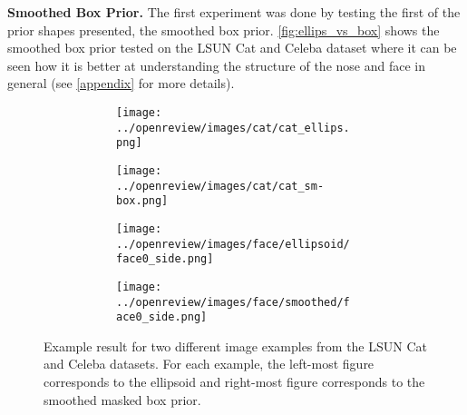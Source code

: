 \textbf{Smoothed Box Prior.}
The first experiment was done by testing the first of the prior shapes presented, the smoothed box prior. \autoref{fig:ellips_vs_box} shows the smoothed box prior tested on the LSUN Cat and Celeba dataset where it can be seen how it is better at understanding the structure of the nose and face in general (see \autoref{appendix} for more details). \begin{figure}[!htb]
    \centering
    \begin{subfigure}{0.40\textwidth}
        \begin{subfigure}{0.48\textwidth}
            \centering
            \texttt{[image: ../openreview/images/cat/cat\_ellips.png]}
        \end{subfigure}
        \begin{subfigure}{0.48\textwidth}
            \centering
            \texttt{[image: ../openreview/images/cat/cat\_sm-box.png]}
        \end{subfigure}
    \end{subfigure}
    \begin{subfigure}{0.40\textwidth}
        \begin{subfigure}{0.48\textwidth}
            \centering
            \texttt{[image: ../openreview/images/face/ellipsoid/face0\_side.png]}
        \end{subfigure}
        \begin{subfigure}{0.48\textwidth}
            \centering
            \texttt{[image: ../openreview/images/face/smoothed/face0\_side.png]}
        \end{subfigure}
    \end{subfigure}
    \caption{Example result for two different image examples from the LSUN Cat and Celeba datasets. For each example, the left-most figure corresponds to the ellipsoid and right-most figure corresponds to the smoothed masked box prior.}
    \label{fig:ellips_vs_box}
\end{figure}

